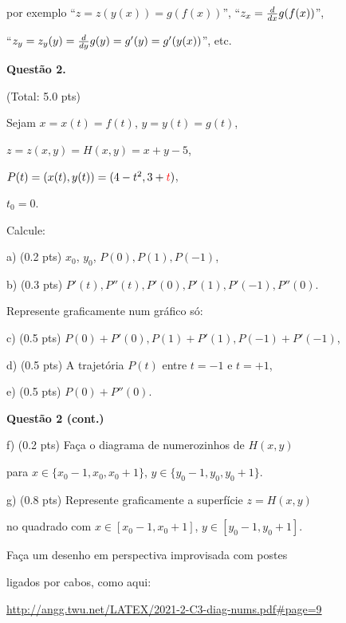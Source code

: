 \documentclass[oneside,12pt]{article}
\begin{document}
por exemplo ``$z=z(y(x))=g(f(x))$'', ``$z_x = \frac{d}{dx} g(f(x))$'',

``$z_y = z_y(y) = \frac{d}{dy} g(y) = g'(y) = g'(y(x))$'', etc.



\newpage



{\bf Questão 2.}

\T(Total: 5.0 pts)

Sejam $x=x(t)=f(t)$, $y=y(t)=g(t)$,

$z=z(x,y)=H(x,y)=x+y-5$,

$P(t)=(x(t),y(t))=(4-t^2,3+\ColorRed{t})$,

$t_0=0$.

\bsk


Calcule:

a) \B(0.2 pts) $x_0$, $y_0$, $P(0), P(1), P(-1)$,

b) \B(0.3 pts) $P'(t), P''(t), P'(0), P'(1), P'(-1), P''(0)$.


\msk

Represente graficamente num gráfico só:

c) \B(0.5 pts) $P(0)+P'(0), P(1)+P'(1), P(-1)+P'(-1)$,  

d) \B(0.5 pts) A trajetória $P(t)$ entre $t=-1$ e $t=+1$,

e) \B(0.5 pts) $P(0)+P''(0)$.



\newpage


{\bf Questão 2 (cont.)}

\msk

f) \B(0.2 pts) Faça o diagrama de numerozinhos de $H(x,y)$

para $x∈\{x_0-1, x_0, x_0+1\}$, $y∈\{y_0-1, y_0, y_0+1\}$.

\msk

g) \B(0.8 pts) Represente graficamente a superfície $z = H(x,y)$

no quadrado com $x∈[x_0-1, x_0+1]$, $y∈[y_0-1, y_0+1]$.

Faça um desenho em perspectiva improvisada com postes

ligados por cabos, como aqui:

\ssk

{\footnotesize

\url{http://angg.twu.net/LATEX/2021-2-C3-diag-nums.pdf#page=9}

}
\end{document}

